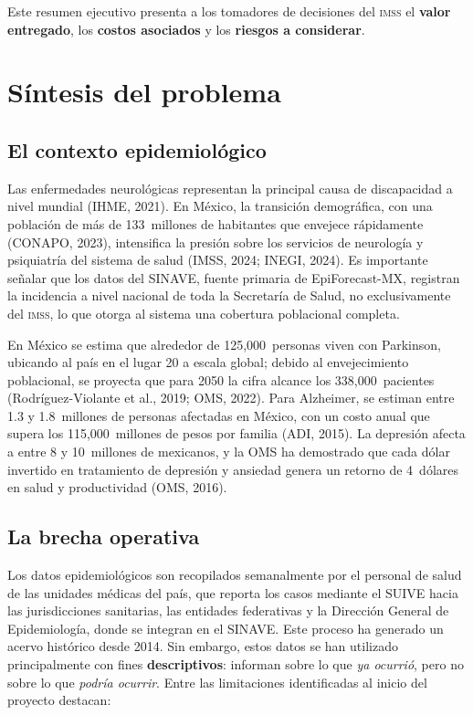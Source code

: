 \documentclass[12pt, letterpaper]{article}
\newcommand{\imss}{\textnormal{\textsc{imss}}}
\begin{document}
Este resumen ejecutivo presenta a los tomadores de decisiones del \imss{} el \textbf{valor entregado}, los \textbf{costos asociados} y los \textbf{riesgos a considerar}.

\newpage
\section{Síntesis del problema}\label{sec:problema}

\subsection{El contexto epidemiológico}

Las enfermedades neurológicas representan la principal causa de discapacidad a nivel mundial (IHME, 2021). En México, la transición demográfica, con una población de más de 133~millones de habitantes que envejece rápidamente (CONAPO, 2023), intensifica la presión sobre los servicios de neurología y psiquiatría del sistema de salud (IMSS, 2024; INEGI, 2024). Es importante señalar que los datos del SINAVE, fuente primaria de EpiForecast-MX, registran la incidencia a nivel nacional de toda la Secretaría de Salud, no exclusivamente del \imss{}, lo que otorga al sistema una cobertura poblacional completa.

En México se estima que alrededor de 125,000~personas viven con Parkinson, ubicando al país en el lugar 20 a escala global; debido al envejecimiento poblacional, se proyecta que para 2050 la cifra alcance los 338,000~pacientes (Rodríguez-Violante et al., 2019; OMS, 2022). Para Alzheimer, se estiman entre 1.3 y 1.8~millones de personas afectadas en México, con un costo anual que supera los 115,000~millones de pesos por familia (ADI, 2015). La depresión afecta a entre 8 y 10~millones de mexicanos, y la OMS ha demostrado que cada dólar invertido en tratamiento de depresión y ansiedad genera un retorno de 4~dólares en salud y productividad (OMS, 2016).

\subsection{La brecha operativa}

Los datos epidemiológicos son recopilados semanalmente por el personal de salud de las unidades médicas del país, que reporta los casos mediante el SUIVE hacia las jurisdicciones sanitarias, las entidades federativas y la Dirección General de Epidemiología, donde se integran en el SINAVE. Este proceso ha generado un acervo histórico desde 2014. Sin embargo, estos datos se han utilizado principalmente con fines \textbf{descriptivos}: informan sobre lo que \emph{ya ocurrió}, pero no sobre lo que \emph{podría ocurrir}. Entre las limitaciones identificadas al inicio del proyecto destacan:
\end{document}
